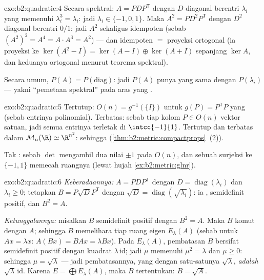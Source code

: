 \begin{solution}{exo:b2:quadratic:4}
Secara spektral: $A = PDP^{\mathsf T}$ dengan $D$ diagonal berentri
$\lambda_i$ yang memenuhi $\lambda_i^3 = \lambda_i$: jadi $\lambda_i \in
\{-1, 0, 1\}$. Maka $A^2 = PD^2P^{\mathsf T}$ dengan $D^2$ diagonal
berentri $0/1$: jadi $A^2$  sekaligus idempoten
(sebab $(A^2)^2 = A^4 = A\cdot A^3 = A^2$) --- dan  idempoten
$=$ proyeksi ortogonal (ia proyeksi ke
$\ker(A^2 - I) = \ker(A-I)\oplus\ker(A+I)$ sepanjang $\ker A$, dan
keduanya ortogonal menurut teorema spektral).

Secara umum, $P(A) = P\!\left(\text{diag}\right)$: jadi $P(A)$ punya
 yang sama dengan  $P(\lambda_i)$ --- yakni
``pemetaan spektral'' pada aras yang .
\end{solution}

\begin{solution}{exo:b2:quadratic:5}
Tertutup: $O(n) = g^{-1}(\{I\})$ untuk $g(P) =
P^{\mathsf T}P$ yang  (sebab entrinya polinomial). Terbatas: sebab tiap
kolom $P \in O(n)$ vektor satuan, jadi semua entrinya terletak di
$\intcc{-1}{1}$. Tertutup dan terbatas dalam $\mathcal{M}_n(\R) \simeq
\R^{n^2}$: sehingga 
(\cref{thm:b2:metric:compactprops}~(2)).

Tak : sebab $\det$ mengambil dua nilai $\pm1$ pada $O(n)$, dan
sebuah surjeksi  ke $\{-1, 1\}$ memecah ruangnya
(lewat hujah \cref{ex:b2:metric:glnr}).
\end{solution}

\begin{solution}{exo:b2:quadratic:6}
\emph{Keberadaannya:} $A = PDP^{\mathsf T}$ dengan $D =
\operatorname{diag}(\lambda_i)$ dan $\lambda_i \geq 0$; tetapkan $B =
P\sqrt D P^{\mathsf T}$ dengan $\sqrt D =
\operatorname{diag}(\sqrt{\lambda_i})$: ia , semidefinit
positif, dan $B^2 = A$.

\emph{Ketunggalannya:} misalkan $B$  semidefinit positif dengan
$B^2 = A$. Maka $B$ komut dengan $A$; sehingga $B$ memelihara tiap ruang eigen
$E_\lambda(A)$ (sebab untuk $Ax = \lambda x$: $A(Bx) = BAx = \lambda Bx$).
Pada $E_\lambda(A)$, pembatasan $B$ bersifat  semidefinit positif
dengan kuadrat $\lambda\,\mathrm{id}$; jadi  $\mu$ memenuhi $\mu^2
= \lambda$ dan $\mu \geq 0$: sehingga $\mu = \sqrt\lambda$ --- jadi
pembatasannya, yang  dengan satu-satunya 
$\sqrt\lambda$, \emph{adalah} $\sqrt\lambda\,\mathrm{id}$. Karena $E =
\bigoplus E_\lambda(A)$, maka $B$ tertentukan: $B = \sqrt A$.
\end{solution}


